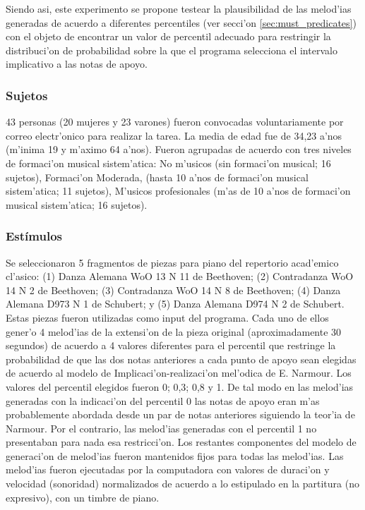 Siendo asi, este experimento se propone testear la plausibilidad de las melod'ias generadas de acuerdo a diferentes percentiles (ver secci'on \ref{sec:must_predicates})
con el objeto de encontrar un valor de percentil adecuado para restringir la distribuci'on de probabilidad sobre la que el programa selecciona el 
intervalo implicativo a las notas de apoyo.

\subsubsection{Sujetos}
43 personas (20 mujeres y 23 varones) fueron convocadas voluntariamente por correo electr'onico para realizar la tarea. La media de edad fue de 34,23 a'nos 
(m'inima 19 y m'aximo 64 a'nos). Fueron agrupadas de acuerdo con tres niveles de formaci'on musical sistem'atica: No m'usicos (sin formaci'on musical; 16 sujetos), 
Formaci'on Moderada, (hasta 10 a'nos de formaci'on musical sistem'atica; 11 sujetos), M'usicos profesionales (m'as de 10 a'nos de formaci'on musical sistem'atica; 16 sujetos).

\subsubsection{Est\'imulos}
Se seleccionaron 5 fragmentos de piezas para piano del repertorio acad'emico cl'asico: (1) Danza Alemana WoO 13 N 11 de Beethoven; (2) Contradanza WoO 14 N 2 de Beethoven;
(3) Contradanza WoO 14 N 8 de Beethoven; (4) Danza Alemana D973 N 1 de Schubert; y (5) Danza Alemana D974 N 2 de Schubert. Estas piezas fueron utilizadas como input del 
programa. Cada uno de ellos gener'o 4 melod'ias de la extensi'on de la pieza original (aproximadamente 30 segundos) de acuerdo a 4 valores diferentes para el percentil 
que restringe la probabilidad de que las dos notas anteriores a cada punto de apoyo sean elegidas de acuerdo al modelo de Implicaci'on-realizaci'on mel'odica de 
E. Narmour. Los valores del percentil elegidos fueron 0; 0,3; 0,8 y 1. De tal modo en las melod'ias generadas con la indicaci'on del percentil 0 las notas de apoyo 
eran m'as probablemente abordada desde un par de notas anteriores siguiendo la teor'ia de Narmour. Por el contrario, las melod'ias generadas con el percentil 1 no 
presentaban para nada esa restricci'on. Los restantes componentes del modelo de generaci'on de melod'ias fueron mantenidos fijos para todas las melod'ias. Las melod'ias 
fueron ejecutadas por la computadora con valores de duraci'on y velocidad (sonoridad) normalizados de acuerdo a lo estipulado en la partitura (no expresivo), 
con un timbre de piano.

